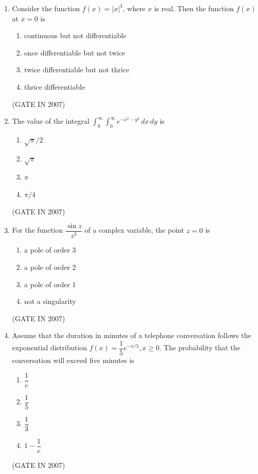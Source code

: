 \documentclass[journal]{IEEEtran}
\begin{document}
\begin{enumerate}
\item Consider the function $f(x) = |x|^3$, where $x$ is real. Then the function $f(x)$ at $x=0$ is 
\begin{enumerate}
\item continuous but not differentiable  
\item once differentiable but not twice  
\item twice differentiable but not thrice  
\item thrice differentiable  
\end{enumerate}
\hfill(GATE IN 2007)

\item The value of the integral $\int_{0}^{\infty} \int_{0}^{\infty} e^{-x^2-y^2} \, dx\, dy$ is  
\begin{multicols}{4}
\begin{enumerate}
\item $\sqrt{\pi}/2$  
\item $\sqrt{\pi}$  
\item $\pi$  
\item $\pi/4$  
\end{enumerate}
\end{multicols}
\hfill(GATE IN 2007)

\item For the function $\dfrac{\sin z}{z^3}$ of a complex variable, the point $z=0$ is  
\begin{multicols}{2}
\begin{enumerate}
\item a pole of order 3  
\item a pole of order 2  
\item a pole of order 1  
\item not a singularity  
\end{enumerate}
\end{multicols}
\hfill(GATE IN 2007)

\item Assume that the duration in minutes of a telephone conversation follows the exponential distribution $f(x) = \dfrac{1}{5} e^{-x/5}, x \geq 0$. The probability that the conversation will exceed five minutes is  
\begin{multicols}{4}
\begin{enumerate}
\item $\dfrac{1}{e}$  
\item $\dfrac{1}{5}$  
\item $\dfrac{1}{3}$  
\item $1 - \dfrac{1}{e}$  
\end{enumerate}
\end{multicols}
\hfill(GATE IN 2007)


\end{enumerate}
\end{document}
